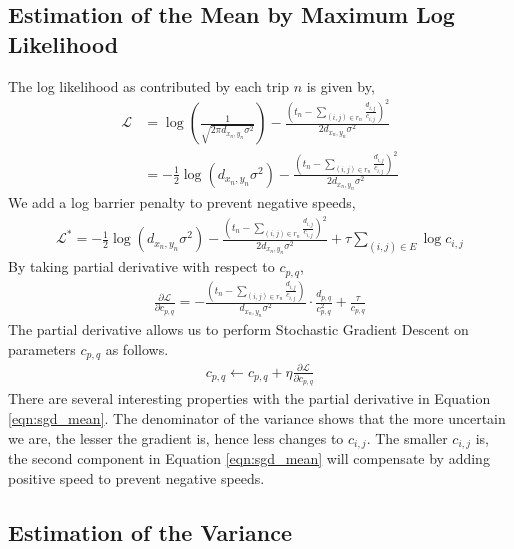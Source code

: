 \documentclass{sig-alternate}
\begin{document}
\subsection{Estimation of the Mean by Maximum Log Likelihood}

The log likelihood as contributed by each trip $n$ is given by, 
\begin{align}
	\mathcal{L} &= \log \left( \frac{1}{\sqrt{2 \pi d_{x_n, y_n} \sigma^2 }} \right) - \frac{\left( t_n - \sum_{ (i,j) \in r_n } \frac{d_{i,j}}{c_{i,j}} \right)^2}{2 d_{x_n, y_n} \sigma^2 } \nonumber \\
	&= - \frac{1}{2} \log \left( d_{x_n, y_n} \sigma^2 \right) - \frac{\left( t_n - \sum_{ (i,j) \in r_n } \frac{d_{i,j}}{c_{i,j}} \right)^2}{2 d_{x_n, y_n} \sigma^2 }
\end{align}
We add a log barrier penalty to prevent negative speeds, 
\begin{align}
	\mathcal{L^*} = - \frac{1}{2} \log \left( d_{x_n, y_n} \sigma^2 \right) - \frac{\left( t_n - \sum_{ (i,j) \in r_n } \frac{d_{i,j}}{c_{i,j}} \right)^2}{2 d_{x_n, y_n} \sigma^2 } + \tau \sum_{(i,j) \in E} \log c_{i,j}
\end{align}
By taking partial derivative with respect to $c_{p,q}$,
\begin{align}
	\label{eqn:sgd_mean}
	\frac{\partial \mathcal{L}}{\partial c_{p,q}} = - \frac{\left( t_n - \sum_{ (i,j) \in r_n } \frac{d_{i,j}}{c_{i,j}} \right)}{d_{x_n, y_n} \sigma^2 } \cdot \frac{d_{p,q}}{c_{p,q}^2} + \frac{\tau}{c_{p,q}}
\end{align}
The partial derivative allows us to perform Stochastic Gradient Descent on parameters $c_{p,q}$ as follows.
\begin{align}
	c_{p,q} \leftarrow c_{p,q} + \eta \frac{\partial \mathcal{L}}{\partial c_{p,q}}
\end{align}
There are several interesting properties with the partial derivative in Equation \ref{eqn:sgd_mean}. The denominator of the variance shows that the more uncertain we are, the lesser the gradient is, hence less changes to $c_{i,j}$. The smaller $c_{i,j}$ is, the second component in Equation \ref{eqn:sgd_mean} will compensate by adding positive speed to prevent negative speeds.

\subsection{Estimation of the Variance}
\end{document}

